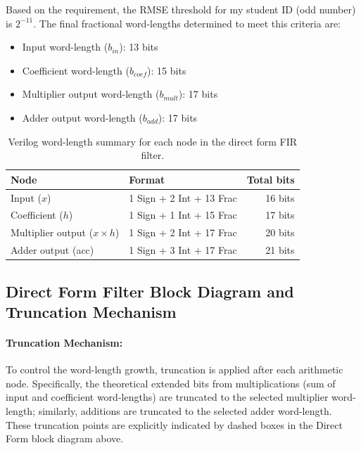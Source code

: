 \documentclass[12pt,a4paper]{article}
\begin{document}
Based on the requirement, the RMSE threshold for my student ID (odd number) is $2^{-11}$. The final fractional word-lengths determined to meet this criteria are:
\begin{itemize}
    \item Input word-length ($b_{in}$): 13 bits
    \item Coefficient word-length ($b_{coef}$): 15 bits
    \item Multiplier output word-length ($b_{mult}$): 17 bits
    \item Adder output word-length ($b_{add}$): 17 bits
\end{itemize}

\begin{table}[H]
    \centering
    \caption{Verilog word-length summary for each node in the direct form FIR filter.}
    \begin{tabular}{llr}
        \hline
        \textbf{Node} & \textbf{Format} & \textbf{Total bits} \\
        \hline
        Input ($x$)                      & 1 Sign + 2 Int + 13 Frac & 16 bits \\
        Coefficient ($h$)                & 1 Sign + 1 Int + 15 Frac & 17 bits \\
        Multiplier output ($x \times h$) & 1 Sign + 2 Int + 17 Frac & 20 bits \\
        Adder output (acc)               & 1 Sign + 3 Int + 17 Frac & 21 bits \\
        \hline
    \end{tabular}
\end{table}

\subsection{Direct Form Filter Block Diagram and Truncation Mechanism}

\paragraph{Truncation Mechanism:}
To control the word-length growth, truncation is applied after each arithmetic node. Specifically, the theoretical extended bits from multiplications (sum of input and coefficient word-lengths) are truncated to the selected multiplier word-length; similarly, additions are truncated to the selected adder word-length. These truncation points are explicitly indicated by dashed boxes in the Direct Form block diagram above.
\end{document}
